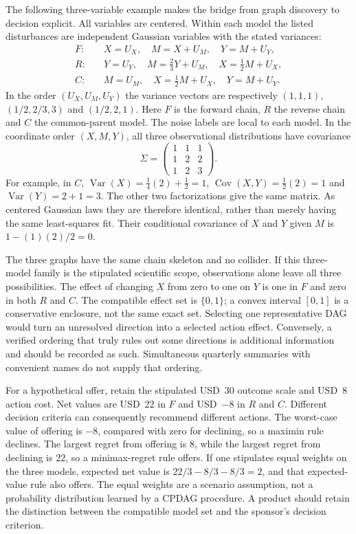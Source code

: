 The following three-variable example makes the bridge from graph discovery to
decision explicit. All variables are centered. Within each model the listed
disturbances are independent Gaussian variables with the stated variances:
\begin{align*}
 F:\quad &X=U_X,\quad M=X+U_M,\quad Y=M+U_Y,\\
 R:\quad &Y=U_Y,\quad M=\tfrac23Y+U_M,\quad X=\tfrac12M+U_X,\\
 C:\quad &M=U_M,\quad X=\tfrac12M+U_X,\quad Y=M+U_Y.
\end{align*}
In the order $(U_X,U_M,U_Y)$ the variance vectors are respectively
$(1,1,1)$, $(1/2,2/3,3)$ and $(1/2,2,1)$.
Here $F$ is the forward chain, $R$ the reverse chain and $C$ the common-parent
model. The noise labels are local to each model. In the coordinate order
$(X,M,Y)$, all three observational distributions have covariance
\[
 \Sigma=\begin{pmatrix}1&1&1\\1&2&2\\1&2&3\end{pmatrix}.
\]
For example, in $C$, $\operatorname{Var}(X)=\tfrac14(2)+\tfrac12=1$,
$\operatorname{Cov}(X,Y)=\tfrac12(2)=1$ and
$\operatorname{Var}(Y)=2+1=3$. The other two factorizations give the same
matrix. As centered Gaussian laws they are therefore identical, rather than
merely having the same least-squares fit. Their conditional covariance of
$X$ and $Y$ given $M$ is $1-(1)(2)/2=0$.
\citep{exec16_s2_exact}

The three graphs have the same chain skeleton and no collider. If this
three-model family is the stipulated scientific scope, observations alone
leave all three possibilities. The effect of changing $X$ from zero to one
on $Y$ is one in $F$ and zero in both $R$ and $C$. The compatible effect set
is $\{0,1\}$; a convex interval $[0,1]$ is a conservative enclosure, not the
same exact set. Selecting one representative DAG would turn an unresolved
direction into a selected action effect. Conversely, a verified ordering
that truly rules out some directions is additional information and should
be recorded as such. Simultaneous quarterly summaries with convenient names
do not supply that ordering. \citep{exec16_s2_exact}

For a hypothetical offer, retain the stipulated USD~30 outcome scale and
USD~8 action cost. Net values are USD~22 in $F$ and USD~$-8$ in $R$ and $C$.
Different decision criteria can consequently recommend different actions.
The worst-case value of offering is $-8$, compared with zero for declining,
so a maximin rule declines. The largest regret from offering is $8$, while
the largest regret from declining is $22$, so a minimax-regret rule offers.
If one stipulates equal weights on the three models, expected net value is
$22/3-8/3-8/3=2$, and that expected-value rule also offers. The equal weights
are a scenario assumption, not a probability distribution learned by a CPDAG
procedure. A product should retain the distinction between the compatible
model set and the sponsor's decision criterion. \citep{exec16_s2_exact}

